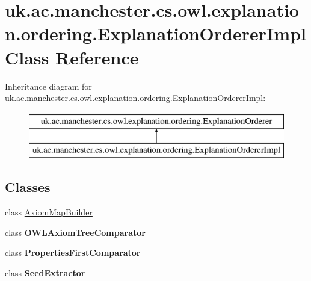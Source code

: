 \hypertarget{classuk_1_1ac_1_1manchester_1_1cs_1_1owl_1_1explanation_1_1ordering_1_1_explanation_orderer_impl}{\section{uk.\-ac.\-manchester.\-cs.\-owl.\-explanation.\-ordering.\-Explanation\-Orderer\-Impl Class Reference}
\label{classuk_1_1ac_1_1manchester_1_1cs_1_1owl_1_1explanation_1_1ordering_1_1_explanation_orderer_impl}
}
Inheritance diagram for uk.\-ac.\-manchester.\-cs.\-owl.\-explanation.\-ordering.\-Explanation\-Orderer\-Impl\-:\begin{figure}[H]
\begin{center}
\leavevmode
\includegraphics[height=2.000000cm]{classuk_1_1ac_1_1manchester_1_1cs_1_1owl_1_1explanation_1_1ordering_1_1_explanation_orderer_impl}
\end{center}
\end{figure}
\subsection*{Classes}
\begin{DoxyCompactItemize}
\item 
class \hyperlink{classuk_1_1ac_1_1manchester_1_1cs_1_1owl_1_1explanation_1_1ordering_1_1_explanation_orderer_impl_1_1_axiom_map_builder}{Axiom\-Map\-Builder}
\item 
class {\bfseries O\-W\-L\-Axiom\-Tree\-Comparator}
\item 
class {\bfseries Properties\-First\-Comparator}
\item 
class {\bfseries Seed\-Extractor}
\end{DoxyCompactItemize}

